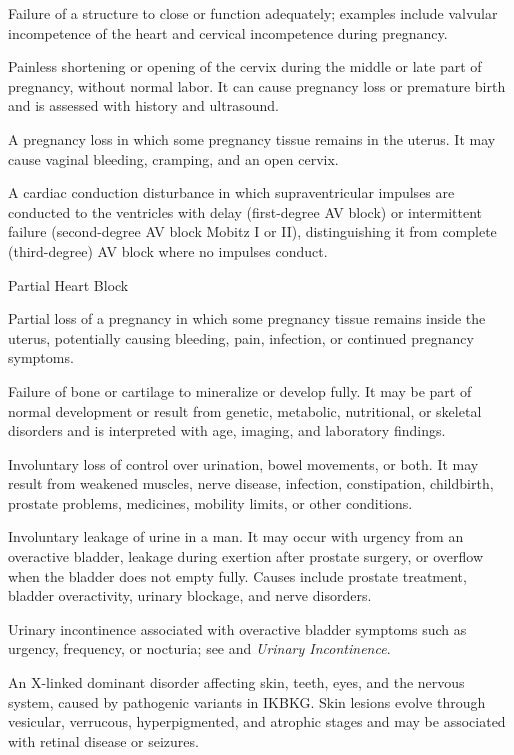  Failure of a structure to close or function adequately; examples include valvular incompetence of the heart and cervical incompetence during pregnancy.

 Painless shortening or opening of the cervix during the middle or late part of pregnancy, without normal labor. It can cause pregnancy loss or premature birth and is assessed with history and ultrasound.

 A pregnancy loss in which some pregnancy tissue remains in the uterus. It may cause vaginal bleeding, cramping, and an open cervix.

 A cardiac conduction disturbance in which supraventricular impulses are conducted to the ventricles with delay (first-degree AV block) or intermittent failure (second-degree AV block Mobitz I or II), distinguishing it from complete (third-degree) AV block where no impulses conduct.

\synonyms
Partial Heart Block

 Partial loss of a pregnancy in which some pregnancy tissue remains inside the uterus, potentially causing bleeding, pain, infection, or continued pregnancy symptoms.

 Failure of bone or cartilage to mineralize or develop fully. It may be part of normal development or result from genetic, metabolic, nutritional, or skeletal disorders and is interpreted with age, imaging, and laboratory findings.

 Involuntary loss of control over urination, bowel movements, or both. It may result from weakened muscles, nerve disease, infection, constipation, childbirth, prostate problems, medicines, mobility limits, or other conditions.

 Involuntary leakage of urine in a man. It may occur with urgency from an overactive bladder, leakage during exertion after prostate surgery, or overflow when the bladder does not empty fully. Causes include prostate treatment, bladder overactivity, urinary blockage, and nerve disorders.

 Urinary incontinence associated with overactive bladder symptoms such as urgency, frequency, or nocturia; see  and \textit{Urinary Incontinence}.

 An X-linked dominant disorder affecting skin, teeth, eyes, and the nervous system,
caused by pathogenic variants in IKBKG. Skin lesions evolve through vesicular,
verrucous, hyperpigmented, and atrophic stages and may be associated with retinal
disease or seizures.

